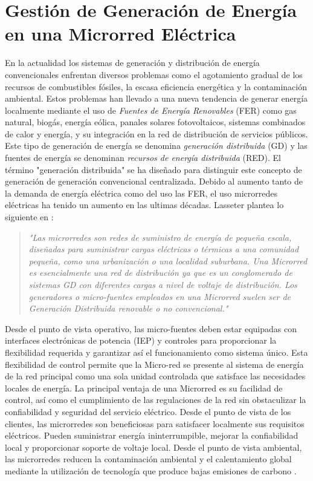 \section{Gestión de Generación de Energía en una Microrred Eléctrica}
En la actualidad los sistemas de generación y distribución de energía convencionales enfrentan diversos problemas como el agotamiento gradual de los recursos de combustibles fósiles, la escasa eficiencia energética y la contaminación ambiental. Estos problemas han llevado a una nueva tendencia de generar energía localmente mediante el uso de \textit{Fuentes de Energía Renovables} (FER) como gas natural, biogás, energía eólica, panales solares fotovoltaicos, sistemas combinados de calor y energía, y su integración en la red de distribución de servicios públicos. Este tipo de generación de energía se denomina \textit{generación distribuida} (GD) y las fuentes de energía se denominan\textit{ recursos de energía distribuida }(RED). El término "generación distribuida" se ha diseñado para distinguir este concepto de generación de generación convencional centralizada. Debido al aumento tanto de la demanda de energía eléctrica como del uso las FER, el uso microrredes eléctricas ha tenido un aumento en las ultimas décadas. Lasseter plantea lo siguiente en  \cite{lasseter2002microgrids}:
\begin{quote}
\textit{"Las microrredes son redes de suministro de energía de pequeña escala, diseñadas para suministrar cargas eléctricas o térmicas a una comunidad pequeña, como una urbanización o una localidad suburbana. Una Microrred es esencialmente una red de distribución ya que es un conglomerado de sistemas GD con diferentes cargas a nivel de voltaje de distribución. Los generadores o micro-fuentes empleados en una Microrred suelen ser de Generación Distribuida renovable o no convencional."}
\end{quote}


Desde el punto de vista operativo, las micro-fuentes deben estar equipadas con interfaces electrónicas de potencia (IEP) y controles para proporcionar la flexibilidad requerida y  garantizar así el funcionamiento como sistema único. Esta flexibilidad de control permite que la Micro-red se presente al sistema de energía de la red principal como una sola unidad controlada que satisface las necesidades locales de energía. La principal ventaja de una Microrred es su facilidad de control, así como el cumplimiento de las regulaciones de la red sin obstaculizar la confiabilidad y seguridad del servicio eléctrico. Desde el punto de vista de los clientes, las microrredes son beneficiosas para satisfacer localmente sus requisitos eléctricos. Pueden suministrar energía ininterrumpible, mejorar la confiabilidad local y proporcionar soporte de voltaje local. Desde el punto de vista ambiental, las microrredes reducen la contaminación ambiental y el calentamiento global mediante la utilización de tecnología que produce bajas emisiones de carbono  \cite{lasseter2002microgrids}. 


